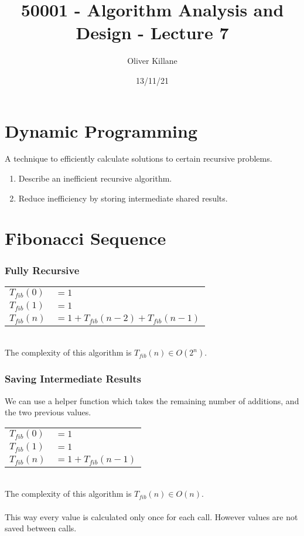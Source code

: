 \documentclass{report}
\title{50001 - Algorithm Analysis and Design - Lecture 7}
\author{Oliver Killane}
\date{13/11/21}
\begin{document}
    \maketitle

    \section*{Dynamic Programming}
        A technique to efficiently calculate solutions to certain recursive problems.
        \begin{enumerate}
            \item Describe an inefficient recursive algorithm.
            \item Reduce inefficiency by storing intermediate shared results.
        \end{enumerate}
    
    \section*{Fibonacci Sequence}
        \subsubsection*{Fully Recursive}    
            \begin{tabular}{l l}
                $T_{fib}(0)$ & $= 1$ \\
                $T_{fib}(1)$ & $= 1$ \\
                $T_{fib}(n)$ & $= 1 + T_{fib}(n-2) + T_{fib}(n-1)$ \\
            \end{tabular}
            \\ The complexity of this algorithm is $T_{fib}(n) \in O(2^n)$.
        \subsubsection*{Saving Intermediate Results}
            We can use a helper function which takes the remaining number of additions, and the two previous values.
            \begin{tabular}{l l}
                $T_{fib}(0)$ & $= 1$ \\
                $T_{fib}(1)$ & $= 1$ \\
                $T_{fib}(n)$ & $= 1 + T_{fib}(n-1)$ \\
            \end{tabular}
            \\The complexity of this algorithm is $T_{fib}(n) \in O(n)$.
            \\
            \\ This way every value is calculated only once for each call. However values are not saved between calls.
\end{document}
